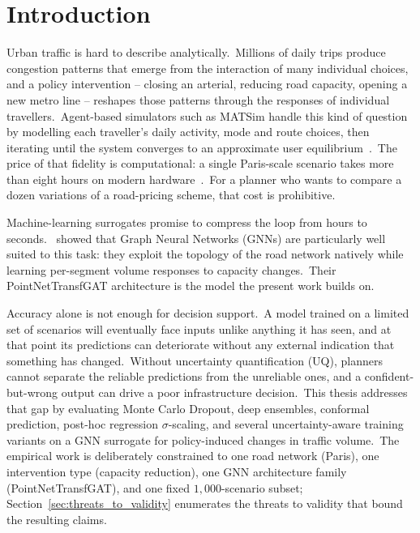 
\chapter{Introduction}\label{chapter:introduction}

Urban traffic is hard to describe analytically.\ Millions of daily trips produce congestion patterns that emerge from the interaction of many individual choices, and a policy intervention -- closing an arterial, reducing road capacity, opening a new metro line -- reshapes those patterns through the responses of individual travellers.\ Agent-based simulators such as MATSim handle this kind of question by modelling each traveller's daily activity, mode and route choices, then iterating until the system converges to an approximate user equilibrium~\cite{horni2016matsim,bonabeau2002agent,railsback2019agent}.\ The price of that fidelity is computational: a single Paris-scale scenario takes more than eight hours on modern hardware~\cite{natterer2025ml}.\ For a planner who wants to compare a dozen variations of a road-pricing scheme, that cost is prohibitive.

Machine-learning surrogates promise to compress the loop from hours to seconds.\ \textcite{natterer2025ml} showed that Graph Neural Networks (GNNs) are particularly well suited to this task: they exploit the topology of the road network natively while learning per-segment volume responses to capacity changes.\ Their PointNetTransfGAT architecture is the model the present work builds on.

Accuracy alone is not enough for decision support.\ A model trained on a limited set of scenarios will eventually face inputs unlike anything it has seen, and at that point its predictions can deteriorate without any external indication that something has changed.\ Without uncertainty quantification (UQ), planners cannot separate the reliable predictions from the unreliable ones, and a confident-but-wrong output can drive a poor infrastructure decision.\ This thesis addresses that gap by evaluating Monte Carlo Dropout, deep ensembles, conformal prediction, post-hoc regression $\sigma$-scaling, and several uncertainty-aware training variants on a GNN surrogate for policy-induced changes in traffic volume.\ The empirical work is deliberately constrained to one road network (Paris), one intervention type (capacity reduction), one GNN architecture family (PointNetTransfGAT), and one fixed $1{,}000$-scenario subset; Section~\ref{sec:threats_to_validity} enumerates the threats to validity that bound the resulting claims.

